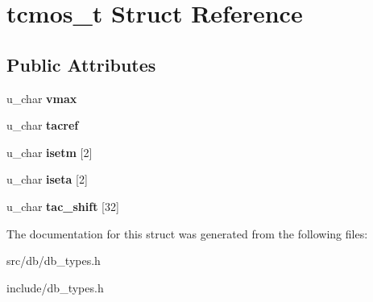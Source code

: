 \hypertarget{structtcmos__t}{
\section{tcmos\_\-t Struct Reference}
\label{structtcmos__t}
}
\subsection*{Public Attributes}
\begin{DoxyCompactItemize}
\item 
\hypertarget{structtcmos__t_ad3221dac86f6a7250f343ea6e282e1b3}{
u\_\-char {\bfseries vmax}}
\label{structtcmos__t_ad3221dac86f6a7250f343ea6e282e1b3}

\item 
\hypertarget{structtcmos__t_ab964a05f01685bffe702bf1349e0ce61}{
u\_\-char {\bfseries tacref}}
\label{structtcmos__t_ab964a05f01685bffe702bf1349e0ce61}

\item 
\hypertarget{structtcmos__t_a32f11217cec15214c974601bc93dfbba}{
u\_\-char {\bfseries isetm} \mbox{[}2\mbox{]}}
\label{structtcmos__t_a32f11217cec15214c974601bc93dfbba}

\item 
\hypertarget{structtcmos__t_abde6b91700ad9f85d73b215706d8b6eb}{
u\_\-char {\bfseries iseta} \mbox{[}2\mbox{]}}
\label{structtcmos__t_abde6b91700ad9f85d73b215706d8b6eb}

\item 
\hypertarget{structtcmos__t_ada83c79ca758b98fcdd7d900037f7598}{
u\_\-char {\bfseries tac\_\-shift} \mbox{[}32\mbox{]}}
\label{structtcmos__t_ada83c79ca758b98fcdd7d900037f7598}

\end{DoxyCompactItemize}


The documentation for this struct was generated from the following files:\begin{DoxyCompactItemize}
\item 
src/db/db\_\-types.h\item 
include/db\_\-types.h\end{DoxyCompactItemize}
